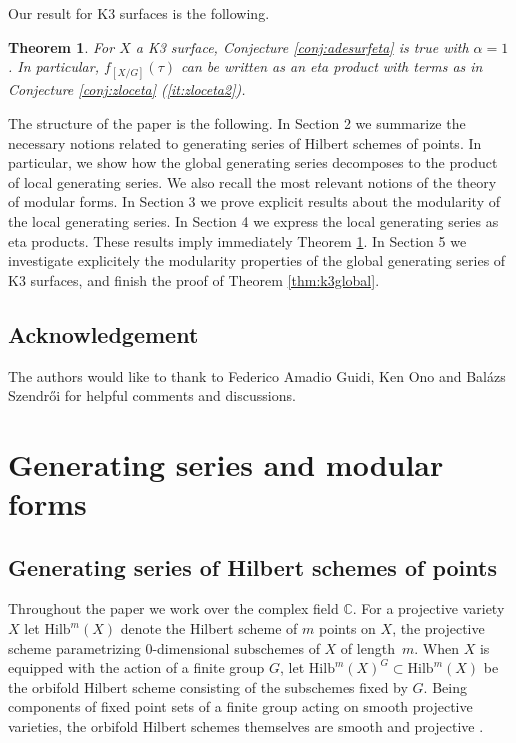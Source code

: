 \documentclass[11pt,a4paper]{amsart}
\newtheorem{theorem}{Theorem}[section]
\theoremstyle{definition}
\newcommand{\SC}{\mathbb{C}}                    %
\begin{document}
Our result for K3 surfaces is the following.
\begin{theorem}\label{thm:k3eta}	
For $X$ a K3 surface, Conjecture \ref{conj:adesurfeta} is true with $\alpha=1$. In particular, $f_{[X/G]}(\tau)$ can be written as an eta product with terms as in Conjecture \ref{conj:zloceta} (\ref{it:zloceta2}).
\end{theorem}

The structure of the paper is the following. In Section 2 we summarize the necessary notions related to generating series of Hilbert schemes of points. In particular, we show how the global generating series decomposes to the product of local generating series. We also recall the most relevant notions of the theory of modular forms. In Section 3 we prove explicit results about the modularity of the local generating series. In Section 4 we express the local generating series as eta products. These results imply immediately Theorem \ref{thm:k3eta}. In Section 5 we investigate explicitely the modularity properties of the global generating series of K3 surfaces, and finish the proof of Theorem \ref{thm:k3global}.

\subsection*{Acknowledgement} The authors would like to thank to Federico Amadio Guidi, Ken Ono and Bal\'azs Szendr\H{o}i  for helpful comments and discussions.

\section{Generating series and modular forms}
\label{sec:genseries}

\subsection{Generating series of Hilbert schemes of points}
Throughout the paper we work over the complex field $\SC$. For a projective variety $X$ let $\mathrm{Hilb}^m(X)$ denote the Hilbert scheme of $m$ points on $X$, the projective scheme parametrizing $0$-dimensional subschemes of $X$ of length~$m$. When $X$ is equipped with the action of a finite group $G$, let $\mathrm{Hilb}^m(X)^G \subset \mathrm{Hilb}^m(X)$ be the orbifold Hilbert scheme consisting of the subschemes fixed by $G$.
%
Being components of fixed point sets of a finite group acting on smooth projective varieties, the orbifold Hilbert schemes themselves are smooth and projective \cite{cartan1957quotient}. 
\end{document}
